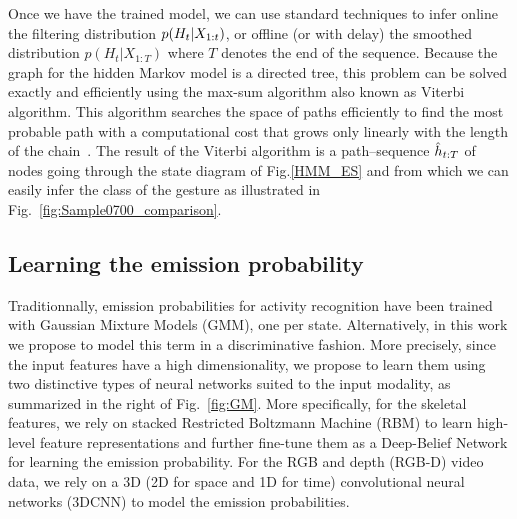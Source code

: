 Once we have the trained model, we can use standard techniques to infer online the filtering
distribution $p(H_t | X_{1:t})$,  or offline (or with delay)
the smoothed distribution $p(H_t | X_{1:T})$ where $T$ denotes the end of the sequence.
Because the graph for the hidden Markov model is a directed tree, this problem can be solved exactly and efficiently using the max-sum algorithm also known as Viterbi algorithm. This algorithm searches the space of paths efficiently to find the most probable path with a computational cost that grows only linearly with the length of the chain~\cite{bishop2006pattern}.
The result of the Viterbi algorithm is a path--sequence $\hat{h}_{t:T}$ of nodes going through the state diagram of
Fig.\ref{HMM_ES} and from which we can easily infer the class of the gesture as illustrated in Fig.~\ref{fig:Sample0700_comparison}.



\subsection{Learning the emission probability \emissionprob{}}
\label{sec:ProblemFormation}

Traditionnally, emission probabilities for activity recognition have been trained with Gaussian Mixture Models (GMM), one per state.
%
Alternatively, in this work we propose to model this term in a discriminative fashion.
More precisely, since the input features have a high dimensionality,
we propose to learn them using two distinctive types of neural networks suited to the input modality,
as summarized in the right of Fig.~\ref{fig:GM}.
%
More specifically, for  the skeletal features, we rely on stacked Restricted Boltzmann Machine (RBM)
to learn  high-level feature representations and further fine-tune them as a Deep-Belief Network
for learning the emission probability.
%
For the RGB and depth (RGB-D) video data, we rely on a 3D (2D for space and 1D for time)
convolutional neural networks (3DCNN) to model the emission probabilities.

